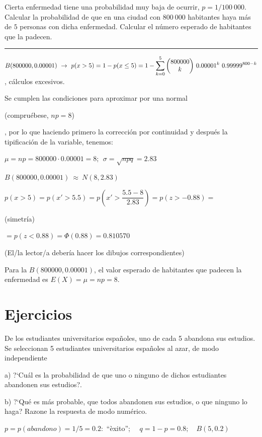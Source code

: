 \vspace{4mm}%
\begin{ejemplo}
\begin{ejre}
 Cierta enfermedad tiene una probabilidad muy baja de ocurrir, $p =1/100\ 000$. Calcular la probabilidad de que en una ciudad con $800\ 000$ habitantes haya más de $5$ personas con dicha enfermedad. Calcular el número esperado de habitantes que la padecen.
 
 \rule{100pt}{0.1pt}
 
 $B(800000,0.00001) \ \to \ p(x>5)=1-p(x\le 5)=1-\displaystyle \sum_{k=0}^5 \mqty(800000\\k) \ 0.00001^k\ 0.99999^{800-k}$, cálculos excesivos.
 
 Se cumplen las condiciones para aproximar por una normal   \begin{footnotesize} \textcolor{gris}{(compruébese, $np=8$)} \end{footnotesize}, por lo que haciendo primero la corrección por continuidad y después la tipificación de la variable, tenemos:
 
 $\mu=np=800000\cdot 0.00001=8;\ \ \sigma=\sqrt{npq}=2.83$
 
 $B(800000,0.00001) \ \approx \ N(8,2.83)$
 
 $p(x>5)=p(x'>5.5)= p\left(x'> \dfrac{5.5-8}{2.83} \right) = p(z>-0.88)=$  \begin{footnotesize} \textcolor{gris}{(simetría)} \end{footnotesize} $=p(z<0.88)=\Phi(0.88)=0.810570$ $\qquad $ \begin{footnotesize} \textcolor{gris}{(El/la lector/a debería hacer los dibujos correspondientes)} \end{footnotesize}
 
 Para la  $B(800000,0.00001)$, el valor esperado de habitantes que padecen la enfermedad es $E(X)=\mu=np=8$.

\end{ejre}
\end{ejemplo}



\section{Ejercicios}

\vspace{4mm}
\begin{ejemplo}
\begin{ejer}
De los estudiantes universitarios españoles, uno de cada 5 abandona sus estudios. Se seleccionan 5 estudiantes universitarios españoles al azar, de modo independiente

a) ?`Cuál es la probabilidad de que uno o ninguno de dichos estudiantes abandonen sus estudios?.

b) ?`Qué es más probable, que todos abandonen sus estudios, o que ninguno lo haga? Razone la respuesta de modo numérico.

\end{ejer}
\end{ejemplo}
$p=p(abandono)=1/5=0.2:$ ``èxito''; $\quad q=1-p=0.8;\quad B(5,0.2)$

